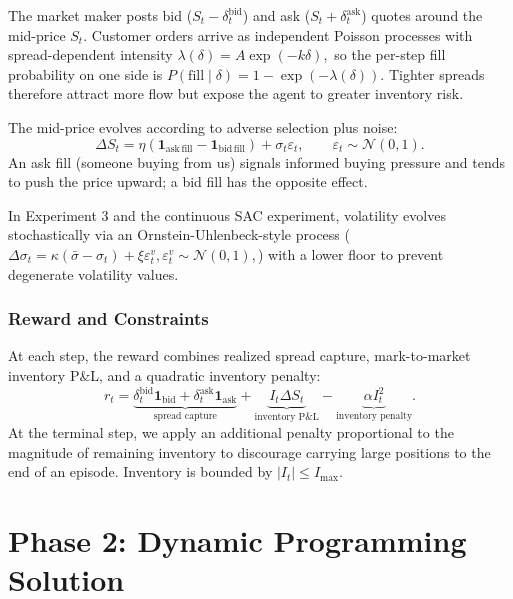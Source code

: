 \documentclass[11pt,a4paper]{article}
\begin{document}
The market maker posts bid ($S_t - \delta_t^{\mathrm{bid}}$) and ask ($S_t + \delta_t^{\mathrm{ask}}$) quotes around the mid-price $S_t$. Customer orders arrive as independent Poisson processes with spread-dependent intensity $    \lambda(\delta) = A \exp(-k \delta),$ so the per-step fill probability on one side is $    P(\text{fill}\mid \delta) = 1 - \exp(-\lambda(\delta)).$ Tighter spreads therefore attract more flow but expose the agent to greater inventory risk.

The mid-price evolves according to adverse selection plus noise:
\begin{equation}
    \Delta S_t = \eta \left(\mathbf{1}_{\mathrm{ask\,fill}} - \mathbf{1}_{\mathrm{bid\,fill}}\right) + \sigma_t \varepsilon_t,
    \qquad \varepsilon_t \sim \mathcal{N}(0,1).
\end{equation}
An ask fill (someone buying from us) signals informed buying pressure and tends to push the price upward; a bid fill has the opposite effect.

In Experiment 3 and the continuous SAC experiment, volatility evolves stochastically via an Ornstein-Uhlenbeck-style process ($\Delta \sigma_t = \kappa(\bar \sigma - \sigma_t) + \xi \varepsilon_t^v, \varepsilon_t^v \sim \mathcal{N}(0,1),$) with a lower floor to prevent degenerate volatility values.
\subsubsection{Reward and Constraints}

At each step, the reward combines realized spread capture, mark-to-market inventory P\&L, and a quadratic inventory penalty:
\begin{equation}
    r_t =
    \underbrace{\delta_t^{\mathrm{bid}} \mathbf{1}_{\mathrm{bid}} + \delta_t^{\mathrm{ask}} \mathbf{1}_{\mathrm{ask}}}_{\text{spread capture}}
    +
    \underbrace{I_t \Delta S_t}_{\text{inventory P\&L}}
    -
    \underbrace{\alpha I_t^2}_{\text{inventory penalty}}.
\end{equation}
At the terminal step, we apply an additional penalty proportional to the magnitude of remaining inventory to discourage carrying large positions to the end of an episode. Inventory is bounded by $|I_t| \le I_{\max}$.

\section{Phase 2: Dynamic Programming Solution}
\end{document}
